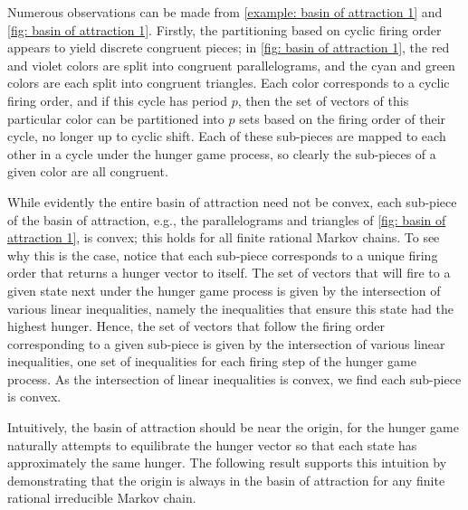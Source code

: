 \begin{remark}\label{remark: convex partition basin}
Numerous observations can be made from \cref{example: basin of attraction 1} 
and \cref{fig: basin of attraction 1}.
Firstly, the partitioning based on cyclic firing order appears to yield 
discrete congruent pieces; in \cref{fig: basin of attraction 1}, 
the red and violet colors are split into congruent parallelograms, 
and the cyan and green colors are each split into congruent triangles.
Each color corresponds to a cyclic firing order, and if this cycle has period $p$, 
then the set of vectors of this particular color 
can be partitioned into $p$ sets based on the firing order of their cycle, 
no longer up to cyclic shift.
Each of these sub-pieces are mapped to each other in a cycle 
under the hunger game process, 
so clearly the sub-pieces of a given color are all congruent.

While evidently the entire basin of attraction need not be convex, 
each sub-piece of the basin of attraction, e.g., 
the parallelograms and triangles of \cref{fig: basin of attraction 1}, is convex; 
this holds for all finite rational Markov chains.
To see why this is the case, notice that each sub-piece 
corresponds to a unique firing order that returns a hunger vector to itself.
The set of vectors that will fire to a given state next under the hunger game process 
is given by the intersection of various linear inequalities, 
namely the inequalities that ensure this state had the highest hunger.
Hence, the set of vectors that follow the firing order corresponding to a given sub-piece 
is given by the intersection of various linear inequalities, 
one set of inequalities for each firing step of the hunger game process.
As the intersection of linear inequalities is convex, we find each sub-piece is convex.
\end{remark}

Intuitively, the basin of attraction should be near the origin, 
for the hunger game naturally attempts to equilibrate the hunger vector 
so that each state has approximately the same hunger.
The following result supports this intuition by demonstrating that the origin 
is always in the basin of attraction for any finite rational irreducible Markov chain.

